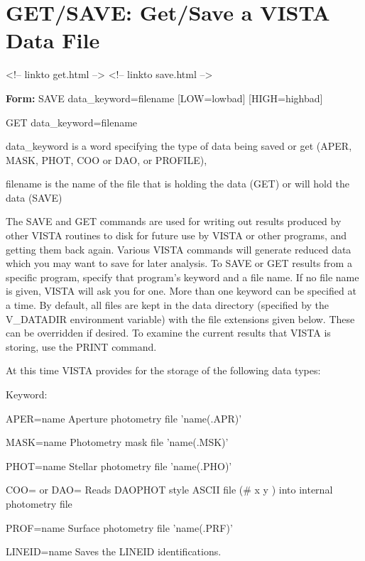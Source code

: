 \section{GET/SAVE: Get/Save a VISTA Data File}
\begin{rawhtml}
<!-- linkto get.html -->
<!-- linkto save.html -->
\end{rawhtml}
\begin{command}
  \item[\textbf{Form: } SAVE data\_keyword=filename {[LOW=lowbad]} 
       {[HIGH=highbad]}\hfill]{}
  \item[GET  data\_keyword=filename\hfill]{}
  \item[data\_keyword]{is a word specifying the type of data
       being saved or get (APER, MASK, PHOT, COO or DAO, or PROFILE),}
  \item[filename]{is the name of the file that is holding
       the data (GET) or will hold the data (SAVE)}
\end{command}

The SAVE and GET commands are used for writing out results produced by
other VISTA routines to disk for future use by VISTA or other programs, and
getting them back again.  Various VISTA commands will generate reduced data
which you may want to save for later analysis.  To SAVE or GET results from
a specific program, specify that program's keyword and a file name.  If no
file name is given, VISTA will ask you for one.  More than one keyword can
be specified at a time.  By default, all files are kept in the data
directory (specified by the V\_DATADIR environment variable) with the file
extensions given below.  These can be overridden if desired.  To examine
the current results that VISTA is storing, use the PRINT command.

At this time VISTA provides for the storage of the following data types:

\begin{command}
  \item[Keyword:\hfill]{}
  \item[APER=name]{Aperture photometry file 'name(.APR)'}
  \item[MASK=name]{Photometry mask file 'name(.MSK)'}
  \item[PHOT=name]{Stellar photometry file 'name(.PHO)'}
  \item[COO= or DAO=]{Reads DAOPHOT style ASCII file (\# x y ) into
       internal photometry file}
  \item[PROF=name]{Surface photometry file 'name(.PRF)'}
  \item[LINEID=name]{Saves the LINEID identifications.}
\end{command}

